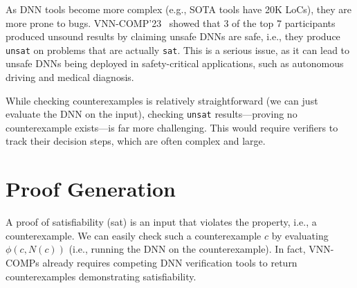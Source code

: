 \documentclass[oneside,11pt,dvipsnames]{book}
\numberwithin{equation}{section}
\theoremstyle{definition}
\theoremstyle{remark}
\newcommand{\sat}{\texttt{sat}}
\newcommand{\unsat}{\texttt{unsat}}
\begin{document}
As DNN tools become more complex (e.g., SOTA tools have 20K LoCs), they are more prone to bugs. VNN-COMP'23~\cite{brix2023fourth} showed that 3 of the top 7 participants produced unsound results by claiming unsafe DNNs are safe, i.e., they produce \unsat{} on problems that are actually \sat{}. This is a serious issue, as it can lead to unsafe DNNs being deployed in safety-critical applications, such as autonomous driving and medical diagnosis.

While checking counterexamples is relatively straightforward (we can just evaluate the DNN on the input), checking \unsat{} results---proving no counterexample exists---is far more challenging. This would require verifiers to track their decision steps, which are often complex and large. %

\section{Proof Generation}\label{sec:proofgen}




A proof of satisfiability (sat) is an input that violates the property, i.e., a counterexample.  We can easily  check such a counterexample $c$ by evaluating $\phi(c,N(c))$ (i.e., running the DNN on the counterexample).
In fact, VNN-COMPs already requires competing DNN verification tools to return counterexamples demonstrating satisfiability.  
\end{document}
